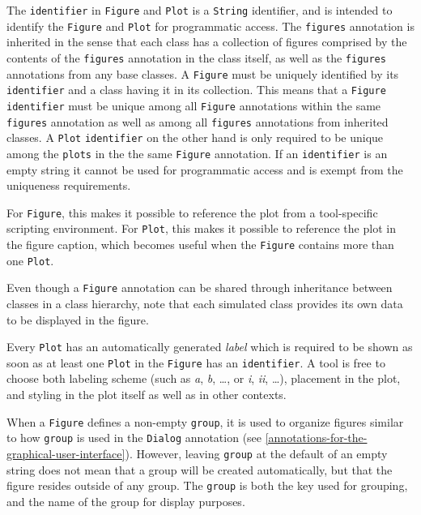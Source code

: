 The \lstinline!identifier! in \lstinline!Figure! and \lstinline!Plot! is a \lstinline!String! identifier, and is intended to identify the \lstinline!Figure! and \lstinline!Plot! for programmatic access.
The \lstinline!figures! annotation is inherited in the sense that each class has a collection of figures comprised by the contents of the \lstinline!figures! annotation in the class itself, as well as the \lstinline!figures! annotations from any base classes.
A \lstinline!Figure! must be uniquely identified by its \lstinline!identifier! and a class having it in its collection.
This means that a \lstinline!Figure! \lstinline!identifier! must be unique among all \lstinline!Figure! annotations within the same \lstinline!figures! annotation as well as among all \lstinline!figures! annotations from inherited classes.
A \lstinline!Plot! \lstinline!identifier! on the other hand is only required to be unique among the \lstinline!plots! in the the same \lstinline!Figure! annotation.
If an \lstinline!identifier! is an empty string it cannot be used for programmatic access and is exempt from the uniqueness requirements.

\begin{nonnormative}
For \lstinline!Figure!, this makes it possible to reference the plot from a
tool-specific scripting environment. For \lstinline!Plot!, this makes it
possible to reference the plot in the figure caption, which becomes useful when
the \lstinline!Figure! contains more than one \lstinline!Plot!.
\end{nonnormative}

Even though a \lstinline!Figure! annotation can be shared through inheritance between classes in a class hierarchy, note that each simulated class provides
its own data to be displayed in the figure.

Every \lstinline!Plot! has an automatically generated \emph{label} which is
required to be shown as soon as at least one \lstinline!Plot! in the
\lstinline!Figure! has an \lstinline!identifier!.  A tool is free to choose both
labeling scheme (such as \emph{a}, \emph{b}, \dots, or \emph{i}, \emph{ii}, \dots), placement in the plot,
and styling in the plot itself as well as in other contexts.

When a \lstinline!Figure! defines a non-empty \lstinline!group!, it is used to
organize figures similar to how \lstinline!group! is used in the
\lstinline!Dialog! annotation (see \cref{annotations-for-the-graphical-user-interface}).  However, leaving \lstinline!group! at
the default of an empty string does not mean that a group will be created
automatically, but that the figure resides outside of any group. The
\lstinline!group! is both the key used for grouping, and the name of the group
for display purposes.

